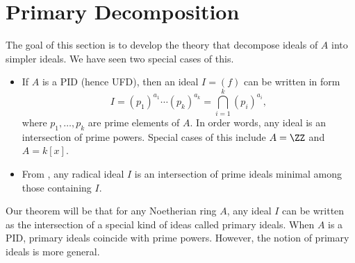 \section{Primary Decomposition}
\label{sec:primary_decomp}
\begin{center}
\end{center}
The goal of this section is to develop 
the theory that decompose ideals of $A$ into simpler ideals.
We have seen two special cases of this.
\begin{itemize}
    \item If $A$ is a PID (hence UFD), then 
    an ideal $I=(f)$ can be written in form
    $$I = (p_1)^{a_1} \cdots (p_k)^{a_k}
    = \bigcap_{i=1}^k (p_i)^{a_i},$$
    where $p_1,\dots,p_k$ are prime elements of $A$.
    In order words, any ideal is an intersection of 
    prime powers. 
    Special cases of this include $A=\ZZ$
    and $A=k[x]$.
    \item From ,
    any radical ideal $I$ is an intersection of 
    prime ideals minimal among those containing $I$.
\end{itemize}
Our theorem will be that for any Noetherian ring $A$,
any ideal $I$ can be written as the intersection
of a special kind of ideas called primary ideals.
When $A$ is a PID, primary ideals coincide with 
prime powers. 
However, the notion of primary ideals is more general.
%
%
%
